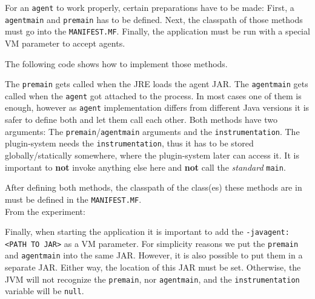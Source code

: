 For an \texttt{agent} to work properly, certain preparations have to be made:
First, a \lstinline{agentmain} and \lstinline{premain} has to be defined.
Next, the classpath of those methods must go into the \texttt{MANIFEST.MF}.
Finally, the application must be run with a special VM parameter to accept agents.

The following code shows how to implement those methods.

The \lstinline{premain} gets called when the JRE loads the agent JAR.
The \lstinline{agentmain} gets called when the \texttt{agent} got attached to the process.
In most cases one of them is enough, however as \texttt{agent} implementation differs from different Java versions it is safer to define both and let them call each other.
Both methods have two arguments: 
The \lstinline{premain}/\lstinline{agentmain} arguments and the \lstinline{instrumentation}.
The plugin-system needs the \lstinline{instrumentation}, thus it has to be stored globally/statically somewhere, where the plugin-system later can access it.
It is important to \textbf{not} invoke anything else here and \textbf{not} call the \textit{standard} \lstinline{main}.

\clearpage

After defining both methods, the classpath of the class(es) these methods are in must be defined in the \lstinline{MANIFEST.MF}.\\
From the experiment:


Finally, when starting the application it is important to add the \lstinline{-javagent:<PATH TO JAR>} as a VM parameter.
For simplicity reasons we put the \lstinline{premain} and \lstinline{agentmain} into the same JAR.
However, it is also possible to put them in a separate JAR.
Either way, the location of this JAR must be set.
Otherwise, the JVM will not recognize the \lstinline{premain}, nor \lstinline{agentmain}, and the \lstinline{instrumentation} variable will be \texttt{null}.


